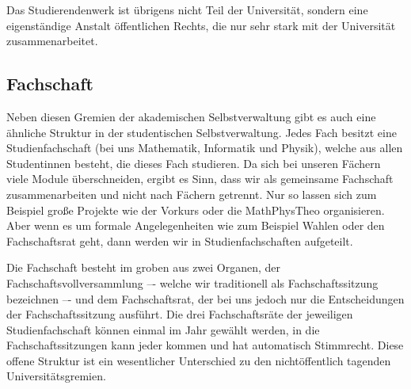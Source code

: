 
Das Studierendenwerk ist übrigens nicht Teil der Universität, sondern eine eigenständige Anstalt öffentlichen Rechts, die nur sehr stark mit der Universität zusammenarbeitet.

\subsection{Fachschaft}
Neben diesen Gremien der akademischen Selbstverwaltung gibt es auch eine ähnliche Struktur in der studentischen Selbstverwaltung. Jedes Fach besitzt eine Studienfachschaft (bei uns Mathematik, Informatik und Physik), welche aus allen Studentinnen besteht, die dieses Fach studieren. Da sich bei unseren Fächern viele Module überschneiden, ergibt es Sinn, dass wir als gemeinsame Fachschaft zusammenarbeiten und nicht nach Fächern getrennt. Nur so lassen sich zum Beispiel große Projekte wie der Vorkurs oder die MathPhysTheo organisieren. Aber wenn es um formale Angelegenheiten wie zum Beispiel Wahlen oder den Fachschaftsrat geht, dann werden wir in Studienfachschaften aufgeteilt.

Die Fachschaft besteht im groben aus zwei Organen, der Fachschaftsvollversammlung –- welche wir traditionell als Fachschaftssitzung bezeichnen –- und dem Fachschaftsrat, der bei uns jedoch nur die Entscheidungen der Fachschaftssitzung ausführt. Die drei Fachschaftsräte der jeweiligen Studienfachschaft können einmal im Jahr gewählt werden, in die Fachschaftssitzungen kann jeder kommen und hat automatisch Stimmrecht. Diese offene Struktur ist ein wesentlicher Unterschied zu den nichtöffentlich tagenden Universitätsgremien. 

